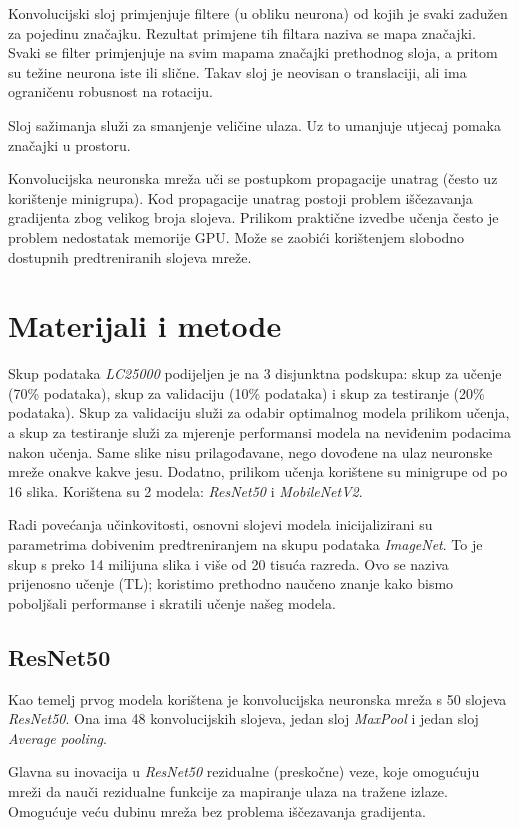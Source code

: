 \documentclass[conference, utf8]{IEEEtran}
\begin{document}
	Konvolucijski sloj primjenjuje filtere (u obliku neurona) od kojih je svaki zadužen za pojedinu značajku. Rezultat primjene tih filtara naziva se mapa značajki. Svaki se filter primjenjuje na svim mapama značajki prethodnog sloja, a pritom su težine neurona iste ili slične. Takav sloj je neovisan o translaciji, ali ima ograničenu robusnost na rotaciju. 
	
	Sloj sažimanja služi za smanjenje veličine ulaza. Uz to umanjuje utjecaj pomaka značajki u prostoru.
	
	Konvolucijska neuronska mreža uči se postupkom propagacije unatrag (često uz korištenje minigrupa). Kod propagacije unatrag postoji problem iščezavanja gradijenta zbog velikog broja slojeva. Prilikom praktične izvedbe učenja često je problem nedostatak memorije GPU. Može se zaobići korištenjem slobodno dostupnih predtreniranih slojeva mreže.
	
	\section{Materijali i metode}
	Skup podataka \textit{LC25000} podijeljen je na 3 disjunktna podskupa: skup za učenje (70\% podataka), skup za validaciju (10\% podataka) i skup za testiranje (20\% podataka). Skup za validaciju služi za odabir optimalnog modela prilikom učenja, a skup za testiranje služi za mjerenje performansi modela na neviđenim podacima nakon učenja. Same slike nisu prilagođavane, nego dovođene na ulaz neuronske mreže onakve kakve jesu. Dodatno, prilikom učenja korištene su minigrupe od po 16 slika. Korištena su 2 modela: \textit{ResNet50} i \textit{MobileNetV2}. 
	
	Radi povećanja učinkovitosti, osnovni slojevi modela inicijalizirani su parametrima dobivenim predtreniranjem na skupu podataka \textit{ImageNet}. To je skup s preko 14 milijuna slika i više od 20 tisuća razreda. Ovo se naziva prijenosno učenje (TL); koristimo prethodno naučeno znanje kako bismo poboljšali performanse i skratili učenje našeg modela.
	
	\subsection{ResNet50}
	Kao temelj prvog modela korištena je konvolucijska neuronska mreža s 50 slojeva \textit{ResNet50}. Ona ima 48 konvolucijskih slojeva, jedan sloj \textit{MaxPool} i jedan sloj \textit{Average pooling}. 
	
	Glavna su inovacija u \textit{ResNet50} rezidualne (preskočne) veze, koje omogućuju mreži da nauči rezidualne funkcije za mapiranje ulaza na tražene izlaze. Omogućuje veću dubinu mreža bez problema iščezavanja gradijenta. 
	
\end{document}
